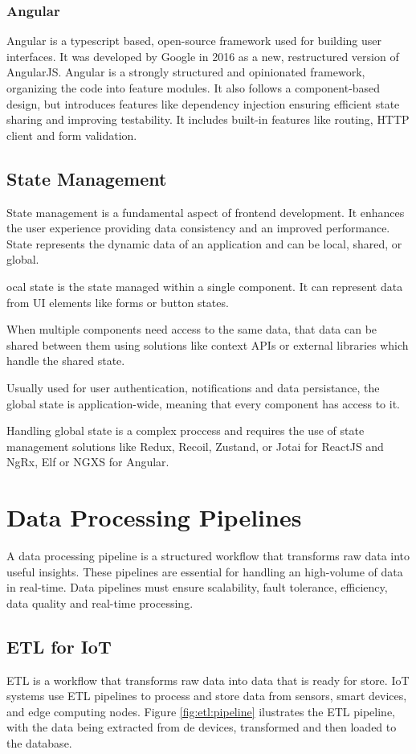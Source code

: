 \subsubsection{Angular}
Angular is a typescript based, open-source framework used for building user
interfaces. It was developed by Google in 2016 as a new, restructured version
of AngularJS. Angular is a strongly structured and opinionated framework,
organizing the code into feature modules. It also follows a component-based
design, but introduces features like dependency injection ensuring efficient
state sharing and improving testability.
It includes built-in features like routing, \gls{HTTP} client and form validation.

\subsection{State Management}
State management is a fundamental aspect of frontend development. It enhances
the user experience providing data consistency and an improved performance.
State represents the dynamic data of an application and can be local, shared,
or global.

ocal state is the state managed within a single component. It can
represent data from \gls{UI} elements like forms or button states.

When multiple components need access to the same data, that data can be shared
between them using solutions like context \gls{API}s or external libraries which
handle the shared state.

Usually used for user authentication, notifications and
data persistance, the global state is application-wide, meaning that
every component has access to it.

Handling global state is a complex proccess and requires the use of state
management solutions like Redux, Recoil, Zustand, or Jotai for ReactJS and
NgRx, Elf or NGXS for Angular.

\section{Data Processing Pipelines}
A data processing pipeline is a structured workflow that transforms raw data
into useful insights. These pipelines are essential for handling an high-volume
of data in real-time. Data pipelines must ensure scalability, fault tolerance,
efficiency, data quality and real-time processing.

\subsection{ETL for IoT}
\gls{ETL} is a workflow that transforms raw data into data that is ready for
store. \gls{IoT} systems use \gls{ETL} pipelines to process and store data from sensors,
smart devices, and edge computing nodes. Figure \ref{fig:etl:pipeline}
ilustrates the \gls{ETL} pipeline, with the data being extracted from de devices,
transformed and then loaded to the database.

